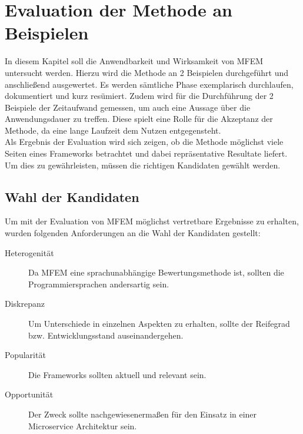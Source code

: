 \section{Evaluation der Methode an Beispielen}\label{MFEMEvaluation}

In diesem Kapitel soll die Anwendbarkeit und Wirksamkeit von \ac{MFEM} untersucht werden. Hierzu wird die Methode an 2 Beispielen durchgeführt und anschließend ausgewertet. Es werden sämtliche Phase exemplarisch durchlaufen, dokumentiert und kurz resümiert. Zudem wird für die Durchführung der 2 Beispiele der Zeitaufwand gemessen, um auch eine Aussage über die Anwendungsdauer zu treffen. Diese spielt eine Rolle für die Akzeptanz der Methode, da eine lange Laufzeit dem Nutzen entgegensteht.\\ 
Als Ergebnis der Evaluation wird sich zeigen, ob die Methode möglichst viele Seiten eines Frameworks betrachtet und dabei repräsentative Resultate liefert.  
Um dies zu gewährleisten, müssen die richtigen Kandidaten gewählt werden.

\subsection{Wahl der Kandidaten}

Um mit der Evaluation von \ac{MFEM} möglichst vertretbare Ergebnisse zu erhalten, wurden folgenden Anforderungen an die Wahl der Kandidaten gestellt:

\begin{description}
	\item[Heterogenität] Da \ac{MFEM} eine sprachunabhängige Bewertungsmethode ist, sollten die Programmiersprachen andersartig sein.
	\item[Diskrepanz] Um Unterschiede in einzelnen Aspekten zu erhalten, sollte der Reifegrad bzw. Entwicklungsstand auseinandergehen.
	\item[Popularität] Die Frameworks sollten aktuell und relevant sein.
	\item[Opportunität] Der Zweck sollte nachgewiesenermaßen für den Einsatz in einer Microservice Architektur sein.
\end{description}

